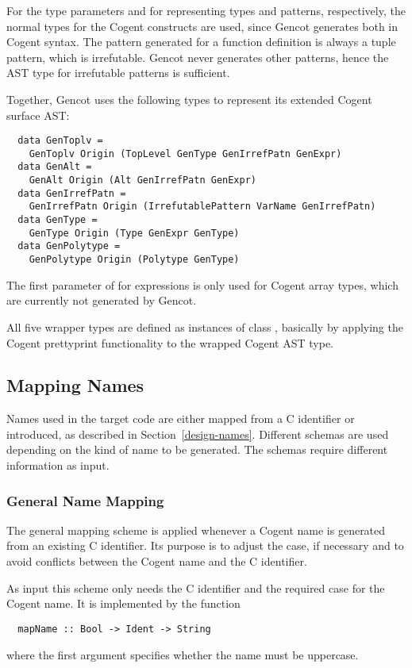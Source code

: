 For the type parameters  and  for representing types and patterns, respectively, the normal types for 
the Cogent constructs are used, since Gencot generates both in Cogent syntax. The pattern generated for a function
definition is always a tuple pattern, which is irrefutable. Gencot never generates other patterns, hence the AST
type for irrefutable patterns is sufficient. 

Together, Gencot uses the following types to represent its extended Cogent surface AST:
\begin{verbatim}
  data GenToplv =
    GenToplv Origin (TopLevel GenType GenIrrefPatn GenExpr)
  data GenAlt =
    GenAlt Origin (Alt GenIrrefPatn GenExpr)
  data GenIrrefPatn = 
    GenIrrefPatn Origin (IrrefutablePattern VarName GenIrrefPatn)
  data GenType = 
    GenType Origin (Type GenExpr GenType)
  data GenPolytype = 
    GenPolytype Origin (Polytype GenType)
\end{verbatim}
The first parameter of  for expressions is only used for Cogent array types, which are currently 
not generated by Gencot.

All five wrapper types are defined as instances of class , basically by applying the Cogent prettyprint
functionality to the wrapped Cogent AST type.

\subsection{Mapping Names}
\label{impl-ccode-names}

Names used in the target code are either mapped from a C identifier or introduced, as described in 
Section~\ref{design-names}. Different schemas are used depending on the kind of name to be generated.
The schemas require different information as input.

\subsubsection{General Name Mapping}

The general mapping scheme is applied whenever a Cogent name is generated from an existing C identifier.
Its purpose is to adjust the case, if necessary and to avoid conflicts between the Cogent name and
the C identifier.

As input this scheme only needs the C identifier and the required case for the Cogent name.
It is implemented by the function
\begin{verbatim}
  mapName :: Bool -> Ident -> String
\end{verbatim}
where the first argument specifies whether the name must be uppercase.

